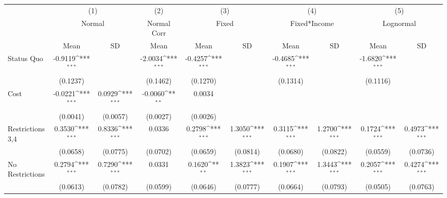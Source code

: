 {
\def\sym#1{\ifmmode^{#1}\else\(^{#1}\)\fi}
\begin{tabular}{l*{9}{c}}
\hline\hline
                &\multicolumn{2}{c}{(1)}              &\multicolumn{1}{c}{(2)}&\multicolumn{2}{c}{(3)}              &\multicolumn{2}{c}{(4)}              &\multicolumn{2}{c}{(5)}              \\
                &\multicolumn{2}{c}{Normal}           &\multicolumn{1}{c}{Normal Corr}&\multicolumn{2}{c}{Fixed}            &\multicolumn{2}{c}{Fixed*Income}     &\multicolumn{2}{c}{Lognormal}        \\
                &     Mean         &       SD         &     Mean         &     Mean         &       SD         &     Mean         &       SD         &     Mean         &       SD         \\
\hline
Status Quo      &  -0.9119\sym{***}&                  &  -2.0034\sym{***}&  -0.4257\sym{***}&                  &  -0.4685\sym{***}&                  &  -1.6820\sym{***}&                  \\
                & (0.1237)         &                  & (0.1462)         & (0.1270)         &                  & (0.1314)         &                  & (0.1116)         &                  \\
Cost            &  -0.0221\sym{***}&   0.0929\sym{***}&  -0.0060\sym{**} &   0.0034         &                  &                  &                  &                  &                  \\
                & (0.0041)         & (0.0057)         & (0.0027)         & (0.0026)         &                  &                  &                  &                  &                  \\
Restrictions 3,4&   0.3530\sym{***}&   0.8336\sym{***}&   0.0336         &   0.2798\sym{***}&   1.3050\sym{***}&   0.3115\sym{***}&   1.2700\sym{***}&   0.1724\sym{***}&   0.4973\sym{***}\\
                & (0.0658)         & (0.0775)         & (0.0702)         & (0.0659)         & (0.0814)         & (0.0680)         & (0.0822)         & (0.0559)         & (0.0736)         \\
No Restrictions &   0.2794\sym{***}&   0.7290\sym{***}&   0.0331         &   0.1620\sym{**} &   1.3823\sym{***}&   0.1907\sym{***}&   1.3443\sym{***}&   0.2057\sym{***}&   0.4274\sym{***}\\
                & (0.0613)         & (0.0782)         & (0.0599)         & (0.0646)         & (0.0777)         & (0.0664)         & (0.0793)         & (0.0505)         & (0.0763)         \\

\end{tabular}}
